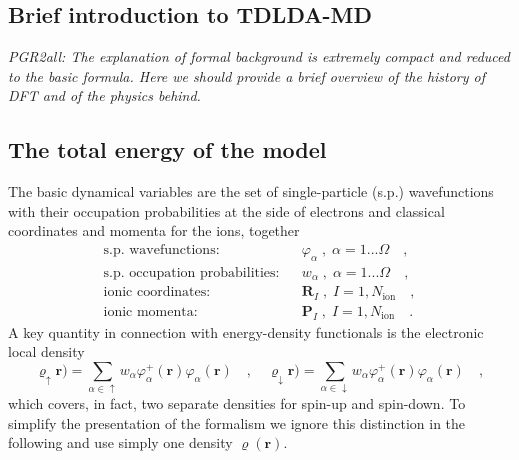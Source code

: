 \documentclass[final,1p]{elsarticle}
\newcommand{\PGRcomm}[1]{{\color{blue}\small\em PGR2all: #1}}
\begin{document}
\subsection{Brief introduction to TDLDA-MD}

\PGRcomm{The explanation of formal background is extremely compact and
reduced to the basic formula. Here we should provide a brief overview
of the history of DFT and of the physics behind.}

\subsection{The total energy of the model}
\label{sec:Etot}

The basic dynamical variables are the set of single-particle
(s.p.) wavefunctions with their occupation probabilities at the side
of electrons and classical coordinates and momenta for the ions,
together
\begin{equation}
\begin{array}{lcl}
  \mbox{s.p. wavefunctions:} && 
  \varphi_\alpha\;,\;\alpha=1...\Omega
  \quad,
\\
  \mbox{s.p. occupation probabilities:} && 
  w_\alpha\;,\;\alpha=1...\Omega
  \quad,
\\
  \mbox{ionic coordinates:} &&
  \mathbf{R}_I\;,\; I=1,N_\mathrm{ion}
  \quad,
\\
  \mbox{ionic momenta:} &&
  \mathbf{P}_I\;,\; I=1,N_\mathrm{ion}
  \quad.
\end{array}
\end{equation}
A key quantity in connection with energy-density functionals
is the electronic local density 
\begin{equation}
  \varrho_\uparrow\mathbf{r})
  =
  \sum_{\alpha\in\uparrow}w_\alpha
  \varphi_\alpha^+(\mathbf{r})\varphi_\alpha^{\mbox{}}(\mathbf{r})
  \quad,\quad
  \varrho_\downarrow\mathbf{r})
  =
  \sum_{\alpha\in\downarrow}w_\alpha
  \varphi_\alpha^+(\mathbf{r})\varphi_\alpha^{\mbox{}}(\mathbf{r})
  \quad,
\label{eq:locdens}
\end{equation}
which covers, in fact, two separate densities for spin-up and
spin-down. To simplify the presentation of the formalism we
ignore this distinction in the following and use simply
one density $\varrho(\mathbf{r})$.
\end{document}
